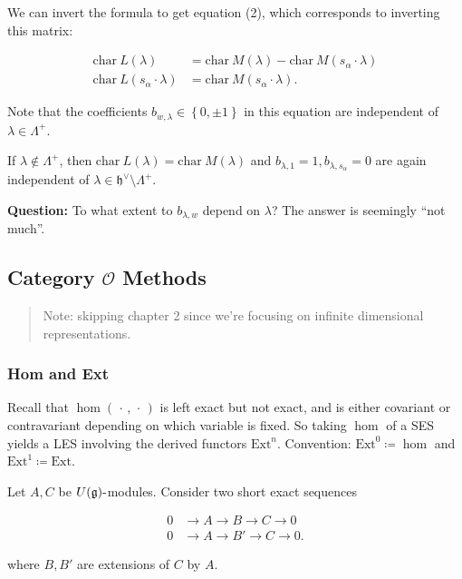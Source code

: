 \documentclass[11pt]{scrartcl}
\theoremstyle{definition}
\theoremstyle{theorem}
\theoremstyle{proof}
\theoremstyle{definition}
\theoremstyle{break}
\theoremstyle{problem}
\newcommand{\ch}[0]{\mathrm{char}~}
\newcommand{\ext}[0]{\text{Ext}}
\newcommand{\dash}[0]{{\hbox{-}}}
\newcommand{\definedas}[0]{\coloneqq}
\newcommand{\dual}[0]{^\vee}
\newcommand{\lieg}[0]{{\mathfrak{g}}}
\newcommand{\lieh}[0]{{\mathfrak{h}}}
\newcommand{\OO}[0]{{\mathcal{O}}}
\newcommand{\theset}[1]{\left\{{#1}\right\}}
\newcommand{\wait}[0]{{\,\cdot\,}}
\renewcommand{\to}[0]{\longrightarrow}
\begin{document}
We can invert the formula to get equation (2), which corresponds to
inverting this matrix:

\begin{align*}
\ch L(\lambda) &= \ch M(\lambda) - \ch M(s_\alpha \cdot \lambda) \\
\ch L(s_\alpha \cdot \lambda) &= \ch M(s_\alpha \cdot \lambda)
.\end{align*}

Note that the coefficients \(b_{w, \lambda} \in \theset{0, \pm 1}\) in
this equation are independent of \(\lambda \in \Lambda^+\).

If \(\lambda \not\in\Lambda^+\), then
\(\ch L(\lambda) = \ch M(\lambda)\) and
\(b_{\lambda, 1} = 1, b_{\lambda, s_\alpha} = 0\) are again independent
of \(\lambda \in \lieh\dual \setminus \Lambda^+\).

\textbf{Question:} To what extent to \(b_{\lambda, w}\) depend on
\(\lambda\)? The answer is seemingly ``not much''.

\hypertarget{category-oo-methods}{%
\subsection{\texorpdfstring{Category \(\OO\)
Methods}{Category \textbackslash OO Methods}}\label{category-oo-methods}}

\begin{quote}
Note: skipping chapter 2 since we're focusing on infinite dimensional
representations.
\end{quote}

\hypertarget{hom-and-ext}{%
\subsubsection{Hom and Ext}\label{hom-and-ext}}

Recall that \(\hom(\wait, \wait)\) is left exact but not exact, and is
either covariant or contravariant depending on which variable is fixed.
So taking \(\hom\) of a SES yields a LES involving the derived functors
\(\ext^n\). Convention: \(\ext^0 \definedas \hom\) and
\(\ext^1 \definedas \ext\).

Let \(A, C\) be \(U(\lieg)\dash\)modules. Consider two short exact
sequences

\begin{align*}
0 &\to A \to B \to C \to 0 \\
0 &\to A \to B' \to C \to 0
.\end{align*}

where \(B, B'\) are extensions of \(C\) by \(A\).
\end{document}
